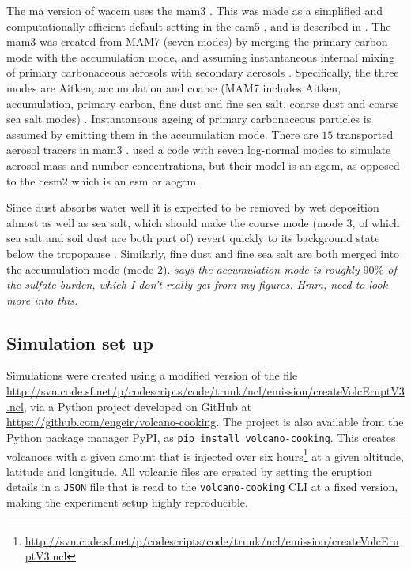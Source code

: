 \documentclass[twocol]{ametsocV5}
\begin{document}
The \acrshort{ma} version of \acrshort{waccm} uses the \acrfull{mam3}
\citep{gettleman2019}. This was made as a simplified and computationally efficient
default setting in the \acrshort{cam5} \citep{liu2016}, and is described in
\citet{liu2012}. The \acrshort{mam3} was created from MAM7 (seven modes) by merging the
primary carbon mode with the accumulation mode, and assuming instantaneous internal
mixing of primary carbonaceous aerosols with secondary aerosols \citep{liu2016}.
Specifically, the three modes are Aitken, accumulation and coarse (MAM7 includes Aitken,
accumulation, primary carbon, fine dust and fine sea salt, coarse dust and coarse sea
salt modes) \citep{liu2016}. Instantaneous ageing of primary carbonaceous particles is
assumed by emitting them in the accumulation mode. There are \(15\) transported aerosol
tracers in \acrshort{mam3} \citep{liu2016}. \citet{marshall2019, marshall2020,
  marshall2021} used a code with seven log-normal modes to simulate aerosol mass and
number concentrations, but their model is an \acrfull{agcm}, as opposed to the
\acrshort{cesm2} which is an \acrfull{esm} or \acrfull{aogcm}.

Since dust absorbs water well it is expected to be removed by wet deposition almost as
well as sea salt, which should make the course mode (mode 3, of which sea salt and soil
dust are both part of) revert quickly to its background state below the tropopause
\citep{liu2012}. Similarly, fine dust and fine sea salt are both merged into the
accumulation mode (mode 2). \emph{\citet{liu2012} says the accumulation mode is roughly
  $90\%$ of the sulfate burden, which I don't really get from my figures. Hmm, need to
  look more into this.}


\subsection{Simulation set up}

Simulations were created using a modified version of the file
\url{http://svn.code.sf.net/p/codescripts/code/trunk/ncl/emission/createVolcEruptV3.ncl},
via a Python project developed on GitHub at
\url{https://github.com/engeir/volcano-cooking}. The project is also available from the
Python package manager PyPI, as \texttt{pip install volcano-cooking}. This creates
volcanoes with a given  amount that is injected over six
hours\footnote{\url{http://svn.code.sf.net/p/codescripts/code/trunk/ncl/emission/createVolcEruptV3.ncl}}
at a given altitude, latitude and longitude. All volcanic  files are created by
setting the eruption details in a \texttt{JSON} file that is read to the
\texttt{volcano-cooking} CLI at a fixed version, making the experiment setup highly
reproducible.
\end{document}
